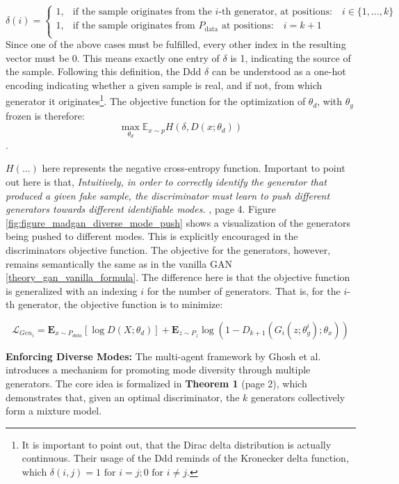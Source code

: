 \[
\delta(i) =
\begin{cases}
1, & \text{if the sample originates from the } i\text{-th generator, at positions:} \quad i \in \{1, \ldots, k\} \\
1, & \text{if the sample originates from } P_{\text{data}} \text{ at positions:} \quad i = k+1 \\
\end{cases}
\]
Since one of the above cases must be fulfilled, every other index in the resulting vector must be $0$. This means exactly one entry of \(\delta\) is 1, indicating the source of the sample.
Following this definition, the Ddd \(\delta\) can be understood as a one-hot encoding indicating whether a given sample is real, and if not, from which generator it originates\footnote{It is important to point out, that the Dirac delta distribution is actually continuous. Their usage of the Ddd reminds of the Kronecker delta function, which \( \delta(i,j) = 1 \text{ for } i=j; 0 \text{ for } i \ne j \).}. The objective function for the optimization of \(\theta_d\), with \(\theta_g\) frozen is therefore:
\begin{equation}
    \max\limits_{\theta_d}\mathbb{E}_{x \sim p} H(\delta, D(x; \theta_d))
\end{equation}.

\noindent
\(H(...)\) here represents the negative cross-entropy function. Important to point out here is that, \textit{Intuitively, in order to correctly identify the generator that produced a given fake sample, the discriminator must learn to push different generators towards different identifiable modes.} \cite{ghosh2018madgan}, page 4. Figure \ref{fig:figure_madgan_diverse_mode_push} shows a visualization of the generators being pushed to different modes. This is explicitly encouraged in the discriminators objective function. The objective for the generators, however, remains semantically the same as in the vanilla GAN \ref{theory_gan_vanilla_formula}. The difference here is that the objective function is generalized with an indexing \(i\) for the number of generators. That is, for the \(i\)-th generator, the objective function is to minimize:

\begin{equation}
    \mathcal{L}_{Gen_i} = \mathbf{E}_{x \sim P_{data}} [ \log D(X; \theta_d) ] + \mathbf{E}_{z \sim P_{z}} \log (1-D_{k+1}(G_i(z; \theta_{g}^{i}); \theta_x))
\end{equation}

\noindent\textbf{Enforcing Diverse Modes:}
The multi-agent framework by Ghosh et al. introduces a mechanism for promoting mode diversity through multiple generators. The core idea is formalized in \textbf{Theorem 1} \cite{ghosh2018madgan} (page 2), which demonstrates that, given an optimal discriminator, the \(k\) generators collectively form a mixture model.

